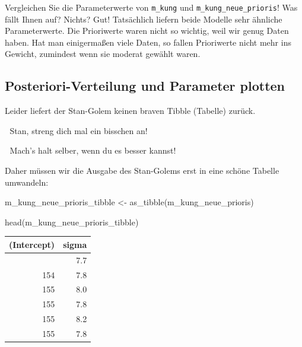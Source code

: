 \documentclass[
  ngerman,
  letterpaper,
  twoside,
  open=any]{scrbook}
\newenvironment{Shaded}{\begin{snugshade}}{\end{snugshade}}
\newcommand{\FunctionTok}[1]{\textcolor[rgb]{0.28,0.35,0.67}{#1}}
\newcommand{\NormalTok}[1]{\textcolor[rgb]{0.00,0.23,0.31}{#1}}
\newcommand{\OtherTok}[1]{\textcolor[rgb]{0.00,0.23,0.31}{#1}}
\newcounter{none} %
\theoremstyle{definition}
\theoremstyle{plain}
\theoremstyle{definition}
\theoremstyle{definition}
\theoremstyle{definition}
\theoremstyle{definition}
\theoremstyle{remark}
\begin{document}
\begin{tcolorbox}[enhanced jigsaw, arc=.35mm, bottomrule=.15mm, bottomtitle=1mm, breakable, colback=white, colbacktitle=quarto-callout-important-color!10!white, colframe=quarto-callout-important-color-frame, coltitle=black, left=2mm, leftrule=.75mm, opacityback=0, opacitybacktitle=0.6, rightrule=.15mm, title=\textcolor{quarto-callout-important-color}{\faExclamation}\hspace{0.5em}{Wichtig}, titlerule=0mm, toprule=.15mm, toptitle=1mm]

Vergleichen Sie die Parameterwerte von \texttt{m\_kung} und
\texttt{m\_kung\_neue\_prioris}! Was fällt Ihnen auf? Nichts? Gut!
Tatsächlich liefern beide Modelle sehr ähnliche Parameterwerte. Die
Prioriwerte waren nicht so wichtig, weil wir genug Daten haben. Hat man
einigermaßen viele Daten, so fallen Prioriwerte nicht mehr ins Gewicht,
zumindest wenn sie moderat gewählt waren.

\end{tcolorbox}

\subsection{Posteriori-Verteilung und Parameter
plotten}\label{posteriori-verteilung-und-parameter-plotten}

Leider liefert der Stan-Golem keinen braven Tibble (Tabelle) zurück.

\begin{displayquote}
👨 Stan, streng dich mal ein bisschen an!
\end{displayquote}

\begin{displayquote}
🤖 Mach's halt selber, wenn du es besser kannst!
\end{displayquote}

Daher müssen wir die Ausgabe des Stan-Golems erst in eine schöne Tabelle
umwandeln:

\begin{Shaded}
\begin{Highlighting}[]
\NormalTok{m\_kung\_neue\_prioris\_tibble }\OtherTok{\textless{}{-}}
  \FunctionTok{as\_tibble}\NormalTok{(m\_kung\_neue\_prioris)}

\FunctionTok{head}\NormalTok{(m\_kung\_neue\_prioris\_tibble)}
\end{Highlighting}
\end{Shaded}

{\def\LTcaptype{none} %
\begin{longtable}[]{@{}rr@{}}
\toprule\noalign{}
(Intercept) & sigma \\
\midrule\noalign{}
\endhead
\bottomrule\noalign{}
\endlastfoot
155 & 7.7 \\
154 & 7.8 \\
155 & 8.0 \\
155 & 7.8 \\
155 & 8.2 \\
155 & 7.8 \\
\end{longtable}
}
\end{document}
